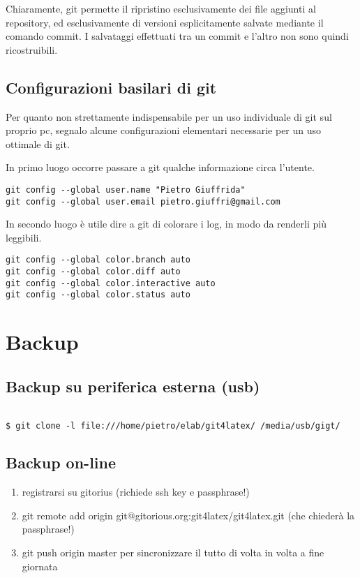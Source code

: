 \documentclass[a4paper,12pt,oneside]{article}
\begin{document}
Chiaramente, git permette il ripristino esclusivamente dei file aggiunti al
repository, ed esclusivamente di versioni esplicitamente salvate mediante il
comando commit. I salvataggi effettuati tra un commit e l'altro non sono quindi
ricostruibili.

\subsection{Configurazioni basilari di git}
Per quanto non strettamente indispensabile per un uso individuale di git sul
proprio pc, segnalo alcune configurazioni elementari necessarie per un uso
ottimale di git.

In primo luogo occorre passare a git qualche informazione circa l'utente.
\begin{lstlisting}
git config --global user.name "Pietro Giuffrida"
git config --global user.email pietro.giuffri@gmail.com
\end{lstlisting}

In secondo luogo è utile dire a git di colorare i log, in modo da renderli più
leggibili.
\begin{lstlisting}
git config --global color.branch auto
git config --global color.diff auto
git config --global color.interactive auto
git config --global color.status auto
\end{lstlisting}

\section{Backup}
\subsection{Backup su periferica esterna (usb)}
\begin{lstlisting}

$ git clone -l file:///home/pietro/elab/git4latex/ /media/usb/gigt/
\end{lstlisting}

\subsection{Backup on-line}

\begin{enumerate}
\item registrarsi su gitorius (richiede ssh key e passphrase!)
\item git remote add origin git@gitorious.org:git4latex/git4latex.git
(che chiederà la passphrase!)
\item git push origin master
per sincronizzare il tutto di volta in volta a fine giornata
\end{enumerate}
\end{document}
